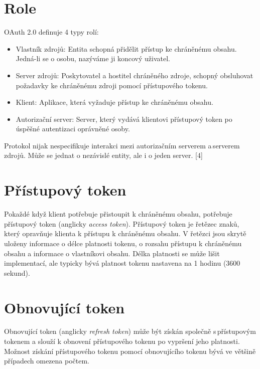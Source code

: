 \documentclass[]{fithesis3}
\begin{document}
	\section{Role}
		OAuth 2.0 definuje 4 typy rolí:

		\begin{itemize}
 		\item Vlastník zdrojů:
  		\newline
		Entita schopná přidělit přístup ke chráněnému obsahu. Jedná-li se o osobu, nazýváme ji 			koncový uživatel.
  		\item Server zdrojů:
  		\newline
		Poskytovatel a hostitel chráněného zdroje, schopný obsluhovat požadavky ke 					chráněnému zdroji pomocí přístupového tokenu.
 	 	\item Klient:
  		\newline
		Aplikace, která vyžaduje přístup ke chráněnému obsahu.
  		\item Autorizační server:
 		\newline
		Server, který vydává klientovi přístupový token po úspěšné autentizaci oprávněné osoby.
		\end{itemize}
		Protokol nijak nespecifikuje interakci mezi autorizačním serverem a\,serverem zdrojů. 				Může se jednat o nezávislé entity, ale i o jeden server. [4]

	\section{Přístupový token}	

	Pokaždé když klient potřebuje přistoupit k chráněnému obsahu, potřebuje přístupový token 			(anglicky \textit{access token}). Přístupový token je řetězec znaků, který opravňuje klienta k 		přístupu k chráněnému obsahu. V řetězci jsou skrytě uloženy informace o délce platnosti 			tokenu, o rozsahu přístupu k chráněnému obsahu a informace o vlastníkovi obsahu. Délka 			platnosti se může lišit implementací, ale typicky bývá platnost tokenu nastavena na 1 hodinu 		(3600 sekund).

	\section{Obnovující token}	

	Obnovující token (anglicky \textit{refresh token}) může být získán společně s\,přístupovým 			tokenem a slouží k obnovení přístupového tokenu po vypršení jeho platnosti. Možnost získání 		přístupového tokenu pomocí obnovujícího tokenu bývá ve většině případech omezena počtem. 
\end{document}
